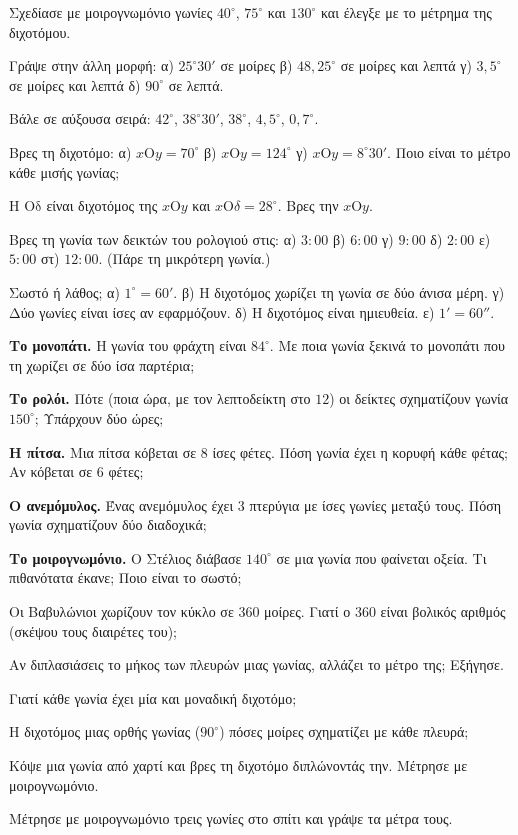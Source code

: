 

\ex Σχεδίασε με μοιρογνωμόνιο γωνίες $40^\circ$, $75^\circ$ και $130^\circ$ και έλεγξε με το μέτρημα της διχοτόμου.

\ex Γράψε στην άλλη μορφή: α) $25^\circ30'$ σε μοίρες \quad β) $48{,}25^\circ$ σε μοίρες και λεπτά \quad γ) $3{,}5^\circ$ σε μοίρες και λεπτά \quad δ) $90^\circ$ σε λεπτά.

\ex Βάλε σε αύξουσα σειρά: $42^\circ$, $38^\circ30'$, $38^\circ$, $4{,}5^\circ$, $0{,}7^\circ$.

\ex Βρες τη διχοτόμο: α) $x\mathrm{Ο}y=70^\circ$ \quad β) $x\mathrm{Ο}y=124^\circ$ \quad γ) $x\mathrm{Ο}y=8^\circ30'$. Ποιο είναι το μέτρο κάθε μισής γωνίας;

\ex Η $\mathrm{Οδ}$ είναι διχοτόμος της $x\mathrm{Ο}y$ και $x\mathrm{Ο}\delta=28^\circ$. Βρες την $x\mathrm{Ο}y$.

\ex Βρες τη γωνία των δεικτών του ρολογιού στις: α) $3{:}00$ \quad β) $6{:}00$ \quad γ) $9{:}00$ \quad δ) $2{:}00$ \quad ε) $5{:}00$ \quad στ) $12{:}00$. (Πάρε τη μικρότερη γωνία.)

\ex Σωστό ή λάθος; α) $1^\circ=60'$. \quad β) Η διχοτόμος χωρίζει τη γωνία σε δύο άνισα μέρη. \quad γ) Δύο γωνίες είναι ίσες αν εφαρμόζουν. \quad δ) Η διχοτόμος είναι ημιευθεία. \quad ε) $1'=60''$.


\ex \textbf{Το μονοπάτι.} Η γωνία του φράχτη είναι $84^\circ$. Με ποια γωνία ξεκινά το μονοπάτι που τη χωρίζει σε δύο ίσα παρτέρια;

\ex \textbf{Το ρολόι.} Πότε (ποια ώρα, με τον λεπτοδείκτη στο $12$) οι δείκτες σχηματίζουν γωνία $150^\circ$; Υπάρχουν δύο ώρες;

\ex \textbf{Η πίτσα.} Μια πίτσα κόβεται σε $8$ ίσες φέτες. Πόση γωνία έχει η κορυφή κάθε φέτας; Αν κόβεται σε $6$ φέτες;

\ex \textbf{Ο ανεμόμυλος.} Ένας ανεμόμυλος έχει $3$ πτερύγια με ίσες γωνίες μεταξύ τους. Πόση γωνία σχηματίζουν δύο διαδοχικά;

\ex \textbf{Το μοιρογνωμόνιο.} Ο Στέλιος διάβασε $140^\circ$ σε μια γωνία που φαίνεται οξεία. Τι πιθανότατα έκανε; Ποιο είναι το σωστό;


\ex Οι Βαβυλώνιοι χωρίζουν τον κύκλο σε $360$ μοίρες. Γιατί ο $360$ είναι βολικός αριθμός (σκέψου τους διαιρέτες του);

\ex Αν διπλασιάσεις το μήκος των πλευρών μιας γωνίας, αλλάζει το μέτρο της; Εξήγησε.

\ex Γιατί κάθε γωνία έχει μία και μοναδική διχοτόμο;

\ex Η διχοτόμος μιας ορθής γωνίας ($90^\circ$) πόσες μοίρες σχηματίζει με κάθε πλευρά;


\ex Κόψε μια γωνία από χαρτί και βρες τη διχοτόμο διπλώνοντάς την. Μέτρησε με μοιρογνωμόνιο.

\ex Μέτρησε με μοιρογνωμόνιο τρεις γωνίες στο σπίτι και γράψε τα μέτρα τους.
